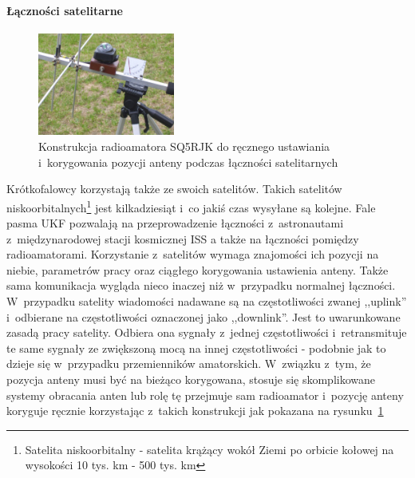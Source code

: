 \documentclass[eng,oneside]{mgr}
\begin{document}
					\paragraph{Łączności satelitarne}
					\begin{figure}
						\vspace{-20pt}
						\begin{center}
							\includegraphics[width=0.4\textwidth]{example_sat_construction}
						\end{center}
						\vspace{-20pt}
						\caption{Konstrukcja radioamatora SQ5RJK do ręcznego ustawiania i~korygowania pozycji anteny podczas łączności satelitarnych}
						\vspace{-10pt}
						\label{fig:example_sat_construction}
					\end{figure}
					Krótkofalowcy korzystają także ze swoich satelitów. Takich satelitów niskoorbitalnych\footnote{Satelita niskoorbitalny - satelita krążący wokół Ziemi po orbicie kołowej na wysokości 10 tys. km - 500 tys. km} jest kilkadziesiąt i~co jakiś czas wysyłane są kolejne. Fale pasma UKF pozwalają na przeprowadzenie łączności z~astronautami z~międzynarodowej stacji kosmicznej ISS a także na łączności pomiędzy radioamatorami. Korzystanie z~satelitów wymaga znajomości ich pozycji na niebie, parametrów pracy oraz ciągłego korygowania ustawienia anteny. Także sama komunikacja wygląda nieco inaczej niż w~przypadku normalnej łączności. W~przypadku satelity wiadomości nadawane są na częstotliwości zwanej ,,uplink'' i~odbierane na częstotliwości oznaczonej jako ,,downlink''. Jest to uwarunkowane zasadą pracy satelity. Odbiera ona sygnały z~jednej częstotliwości i~retransmituje te same sygnały ze zwiększoną mocą na innej częstotliwości - podobnie jak to dzieje się w~przypadku przemienników amatorskich.
					W~związku z~tym, że pozycja anteny musi być na bieżąco korygowana, stosuje się skomplikowane systemy obracania anten lub rolę tę przejmuje sam radioamator i~pozycję anteny koryguje ręcznie korzystając z~takich konstrukcji jak pokazana na rysunku~\ref{fig:example_sat_construction}
\end{document}
